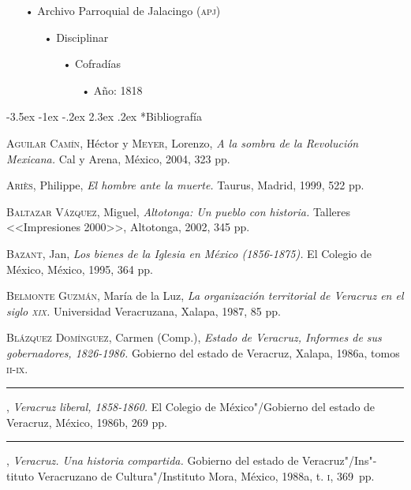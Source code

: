 \documentclass[14pt,twoside,final]{extbook} %
\makeatletter
\renewcommand\section{\@startsection {section}{1}{\z@}%
                                     {-3.5ex \@plus -1ex \@minus -.2ex}%
                                     {2.3ex \@plus .2ex}%
                                     {\normalfont\large\bfseries\sc}}
\makeatother
\begin{document}
\begin{itemize}[noitemsep]
\item[•]Archivo Parroquial de Jalacingo (\textsc{apj})
\begin{itemize}[noitemsep]
\item[•]Disciplinar
\begin{itemize}[noitemsep]
\item[•]Cofradías
\begin{itemize}[noitemsep]
\item[•]Año: 1818
\end{itemize}
\end{itemize}
\end{itemize}
\end{itemize}
\section*{Bibliografía}
\label{sec:bibliografia}
\textsc{Aguilar Camín}, Héctor y \textsc{Meyer}, Lorenzo, \emph{A la sombra de la Revolución Mexicana.} Cal y Arena, México, 2004, 323 pp.

\textsc{Ariès}, Philippe, \emph{El hombre ante la muerte.} Taurus, Madrid, 1999, 522 pp.

\textsc{Baltazar Vázquez}, Miguel, \emph{Altotonga: Un pueblo con historia.} Talleres <<Impresiones 2000>>, Altotonga, 2002, 345 pp.

\textsc{Bazant}, Jan, \emph{Los bienes de la Iglesia en México (1856-1875).} El Colegio de México, México, 1995, 364 pp.

\textsc{Belmonte Guzmán}, María de la Luz, \emph{La organización territorial de Veracruz en el siglo \textsc{xix}.} Universidad Veracruzana, Xalapa, 1987, 85 pp.

\textsc{Blázquez Domínguez}, Carmen (Comp.), \emph{Estado de Veracruz, Informes de sus gobernadores, 1826-1986.} Gobierno del estado de Veracruz, Xalapa, 1986a, tomos \textsc{ii-ix}.

\rule{1cm}{0.4pt}, \emph{Veracruz liberal, 1858-1860.} El Colegio de México"/Gobierno del estado de Veracruz, México, 1986b, 269 pp.

\rule{1cm}{0.4pt}, \emph{Veracruz. Una historia compartida.} Gobierno del estado de Veracruz"/Ins"-tituto Veracruzano de Cultura"/Instituto Mora, México, 1988a, t. \textsc{i}, 369~pp.
\end{document}
